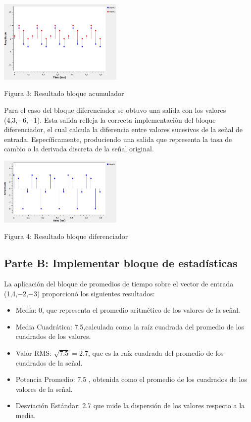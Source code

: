\documentclass{journal}[IEEEtran, twocolumn]             %
\begin{document}
\begin{multicols}{2}
    \begin{center}
    \includegraphics[width=0.45\textwidth]{figs/F2.png}
    \caption{Figura 3: Resultado bloque acumulador}
    \end{center}
    
    Para el caso del bloque diferenciador se obtuvo una salida con los valores (4,3,−6,−1). Esta salida refleja la correcta implementación del bloque diferenciador, el cual calcula la diferencia entre valores sucesivos de la señal de entrada. Específicamente, produciendo una salida que representa la tasa de cambio o la derivada discreta de la señal original.

    \begin{center}
    \includegraphics[width=0.45\textwidth]{figs/F3.png}
    \caption{Figura 4: Resultado bloque diferenciador}
    \end{center}
    
\subsection{Parte B: Implementar bloque de estadísticas}

    La aplicación del bloque de promedios de tiempo sobre el vector de entrada (1,4,−2,−3) proporcionó los siguientes resultados:
    \begin{itemize}
        \item Media: 0, que representa el promedio aritmético de los valores de la señal.
        \item Media Cuadrática: 7.5,calculada como la raíz cuadrada del promedio de los cuadrados de los valores.
       \item Valor RMS: \(\sqrt{7.5} = 2.7 \), que es la raíz cuadrada del promedio de los cuadrados de la señal.
        \item Potencia Promedio: 7.5 , obtenida como el promedio de los cuadrados de los valores de la señal.
        \item Desviación Estándar: 2.7 que mide la dispersión de los valores respecto a la media.
         

\end{itemize}
\end{multicols}
\end{document}
